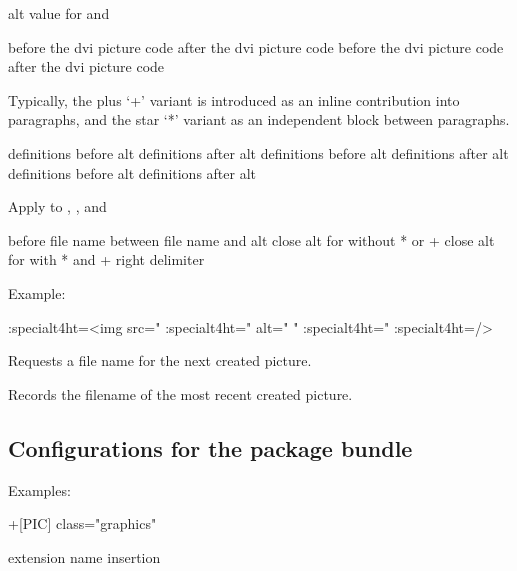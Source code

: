  {alt value for   and }\EndDoc


 {before the dvi picture code} {after the dvi picture code}\EndDoc
{} {before the dvi picture code} {after the dvi picture code}\EndDoc

  Typically, the plus `+' variant is introduced as an inline
  contribution into paragraphs, and the star `*' variant as an
  independent block between paragraphs.

 {definitions before alt} {definitions after alt}\EndDoc
{} {definitions before alt} {definitions after alt}\EndDoc
{} {definitions before alt} {definitions after alt}\EndDoc

Apply to , , and 


{before file name}
{between file name and alt}
{close alt for   without * or +}
{close alt for   with * and +}
{right delimiter}\EndDoc

  Example:

\begin{texsource}
  {\ht:special{t4ht=<img src="}}
  {\ht:special{t4ht=" alt="}}
  {" }
  {\ht:special{t4ht=" }}
  {\ht:special{t4ht=/>}}
\end{texsource}


   Requests a file name for the next created picture.


   Records the filename of the most recent created picture.

\subsection{Configurations for the  package bundle}

\EndDoc


Examples:

\begin{texsource}
   {\Picture+[PIC]{ class="graphics"}}
   {\EndPicture }
\end{texsource}


{extension name}
{insertion}\EndDoc


